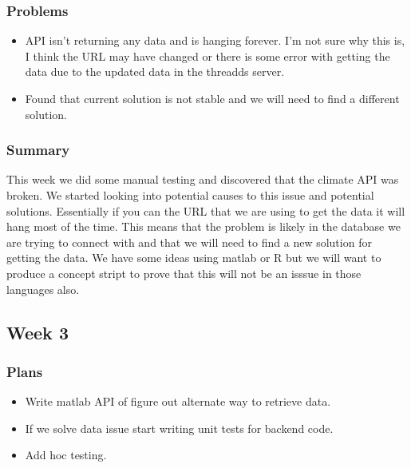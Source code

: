 \documentclass[onecolumn, draftclsnofoot,10pt, compsoc]{article}
\begin{document}
			\subsubsection{Problems}
			    \begin{itemize}
			        \item API isn't returning any data and is hanging forever. I'm not sure why this is, I think the URL may have changed or there is some error with getting the data due to the updated data in the threadds server.
			        \item Found that current solution is not stable and we will need to find a different solution.\\
			    \end{itemize}
			\subsubsection{Summary} This week we did some manual testing and discovered that the climate API was broken. We started looking into potential causes to this issue and potential solutions. Essentially if you can the URL that we are using to get the data it will hang most of the time. This means that the problem is likely in the database we are trying to connect with and that we will need to find a new solution for getting the data. We have some ideas using matlab or R but we will want to produce a concept stript to prove that this will not be an isssue in those languages also.\\
			
		\subsection{Week 3}
			\subsubsection{Plans}
			    \begin{itemize}
			        \item Write matlab API of figure out alternate way to retrieve data.\\
			        \item If we solve data issue start writing unit tests for backend code.
			        \item Add hoc testing.\\
			    \end{itemize}
\end{document}

